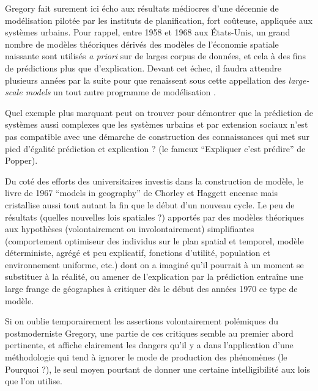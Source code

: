 Gregory fait surement ici écho aux résultats médiocres \autocite{Lee1973} d'une décennie de modélisation pilotée par les instituts de planification, fort coûteuse, appliquée aux systèmes urbains. Pour rappel, entre 1958 et 1968 aux États-Unis, un grand nombre de modèles théoriques \autocite[7-9]{Batty1979} dérivés des modèles de l'économie spatiale naissante sont utilisés \textit{a priori} sur de larges corpus de données, et cela à des fins de prédictions plus que d'explication. Devant cet échec, il faudra attendre plusieurs années par la suite pour que renaissent sous cette appellation des \textit{large-scale models} un tout autre programme de modélisation \autocite{Boyce1988}.

Quel exemple plus marquant peut on trouver pour démontrer que la prédiction de systèmes aussi complexes que les systèmes urbains et par extension sociaux n'est pas compatible avec une démarche de construction des connaissances qui met sur pied d'égalité prédiction et explication ? (le fameux \enquote{Expliquer c'est prédire} de Popper).

Du coté des efforts des universitaires investis dans la construction de modèle, le livre de 1967 \foreignquote{english}{models in geography} de Chorley et Haggett encense mais cristallise aussi \textcite{Golledge2006} tout autant la fin que le début d'un nouveau cycle. Le peu de résultats (quelles nouvelles lois spatiales ?) apportés par des modèles théoriques aux hypothèses (volontairement ou involontairement) simplifiantes (comportement optimiseur des individus sur le plan spatial et temporel, modèle déterministe, agrégé et peu explicatif, fonctions d'utilité, population et environnement uniforme, etc.) dont on a imaginé qu'il pourrait à un moment se substituer à la réalité, ou amener de l'explication par la prédiction \autocite[41]{Gregory1978} entraîne une large frange de géographes à critiquer dès le début des années 1970 ce type de modèle.

Si on oublie temporairement les assertions volontairement polémiques du postmoderniste Gregory, une partie de ces critiques semble au premier abord pertinente, et affiche clairement les dangers qu'il y a dans l'application d'une méthodologie qui tend à ignorer le mode de production des phénomènes (le Pourquoi ?), le seul moyen pourtant de donner une certaine intelligibilité aux lois que l'on utilise. \autocite[14-15]{Besse2000}


